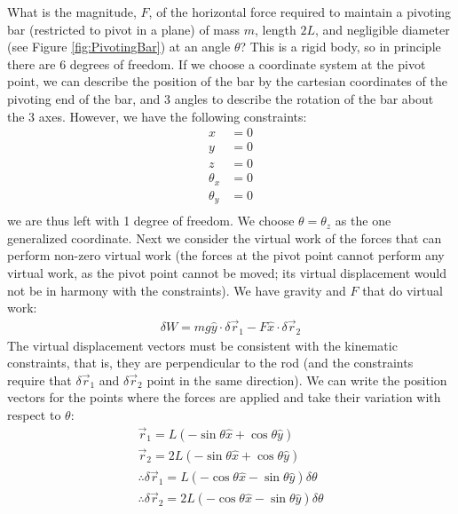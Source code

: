 \begin{example}{0pt}{What is the magnitude, $F$, of the horizontal force required to maintain a pivoting bar (restricted to pivot in a plane) of mass $m$, length $2L$, and negligible diameter (see Figure \ref{fig:PivotingBar}) at an angle $\theta$?}{}
This is a rigid body, so in principle there are 6 degrees of freedom. If we choose a coordinate system at the pivot point, we can describe the position of the bar by the cartesian coordinates of the pivoting end of the bar, and 3 angles to describe the rotation of the bar about the 3 axes. However, we have the following constraints:
\begin{align*}
x&=0\nonumber\\
y&=0\nonumber\\
z&=0\nonumber\\
\theta_x &=0\nonumber\\
\theta_y &=0\nonumber\\
\end{align*}
we are thus left with 1 degree of freedom. We choose $\theta=\theta_z$ as the one generalized coordinate. Next we consider the virtual work of the forces that can perform non-zero virtual work (the forces at the pivot point cannot perform any virtual work, as the pivot point cannot be moved; its virtual displacement would not be in harmony with the constraints). We have gravity and $F$ that do virtual work:
\begin{align*}
\delta W = mg\hat y\cdot\delta\vec{r}_1-F\hat x\cdot\delta\vec{r}_2
\end{align*}
The virtual displacement vectors must be consistent with the kinematic constraints, that is, they are perpendicular to the rod (and the constraints require that $\delta\vec{r}_1$ and $\delta\vec{r}_2$ point in the same direction). We can write the position vectors for the points where the forces are applied and take their variation with respect to $\theta$:
\begin{align*}
\vec{r}_1=L(-\sin{\theta}\hat{x}+\cos{\theta}\hat{y})\\
\vec{r}_2=2L(-\sin{\theta}\hat{x}+\cos{\theta}\hat{y})\\
\therefore \delta\vec{r}_1=L(-\cos{\theta}\hat{x}-\sin{\theta}\hat{y})\delta\theta\\
\therefore \delta\vec{r}_2=2L(-\cos{\theta}\hat{x}-\sin{\theta}\hat{y})\delta\theta\\

\end{align*}
\end{example}
